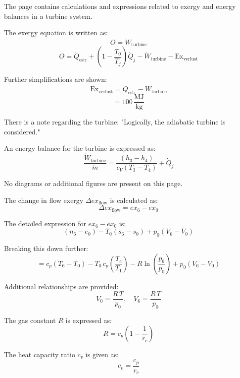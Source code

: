 The page contains calculations and expressions related to exergy and energy balances in a turbine system.  

The exergy equation is written as:  
\[
O = \dot{W}_{\text{turbine}}
\]  
\[
O = \dot{Q}_{\text{estr}} + \left(1 - \frac{T_0}{T_j}\right) \dot{Q}_j - \dot{W}_{\text{turbine}} - \text{Ex}_{\text{verlust}}
\]  

Further simplifications are shown:  
\[
\text{Ex}_{\text{verlust}} = \dot{Q}_{\text{estr}} - \dot{W}_{\text{turbine}}
\]  
\[
= 100 \, \frac{\text{MJ}}{\text{kg}}
\]  

There is a note regarding the turbine:  
"Logically, the adiabatic turbine is considered."  

An energy balance for the turbine is expressed as:  
\[
\frac{\dot{W}_{\text{turbine}}}{\dot{m}} = \frac{(h_3 - h_4)}{c_V (T_3 - T_4)} + \dot{Q}_j
\]  

No diagrams or additional figures are present on this page.

The change in flow exergy \( \Delta ex_{\text{flow}} \) is calculated as:  
\[
\Delta ex_{\text{flow}} = ex_6 - ex_0
\]

The detailed expression for \( ex_6 - ex_0 \) is:  
\[
(n_6 - e_0) - T_0 (s_6 - s_0) + p_0 \left( V_6 - V_0 \right)
\]

Breaking this down further:  
\[
= c_p (T_6 - T_0) - T_0 \, c_p \left( \frac{T_c}{T_1} \right) - R \ln \left( \frac{p_6}{p_0} \right) + p_0 (V_6 - V_0)
\]

Additional relationships are provided:  
\[
V_0 = \frac{R \, T}{p_0}, \quad V_6 = \frac{R \, T}{p_0}
\]

The gas constant \( R \) is expressed as:  
\[
R = c_p \left( 1 - \frac{1}{r_c} \right)
\]

The heat capacity ratio \( c_v \) is given as:  
\[
c_v = \frac{c_p}{r_c}
\]